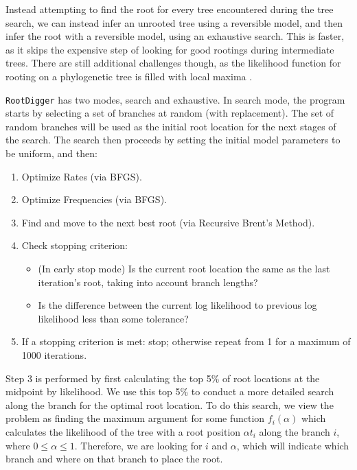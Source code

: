 \documentclass{article}
\newcommand{\RootDiggertt}{\texttt{RootDigger}}
\begin{document}
Instead attempting to find the root for every tree encountered during the tree
search, we can instead infer an unrooted tree using a reversible model, and then
infer the root with a reversible model, using an exhaustive search.
This is faster, as it skips the expensive step of looking for good rootings
during intermediate trees. There are still additional challenges though, as the
likelihood function for rooting on a phylogenetic tree is filled with local
maxima \cite{huelsenbeck_inferring_2002}.

\RootDiggertt{} has two modes, search and exhaustive. In search mode,
the program starts by selecting a set of branches at random (with
replacement).  The set of random branches will be used as the initial root
location for the next stages of the search. The search then proceeds by setting
the initial model parameters to be uniform, and then:

\begin{enumerate}
  \item Optimize Rates (via BFGS).
  \item Optimize Frequencies (via BFGS).
  \item Find and move to the next best root (via Recursive Brent's Method).
  \item Check stopping criterion:
        \begin{itemize}
          \item (In early stop mode) Is the current root location the same as
                the last iteration's root, taking into account branch lengths?
          \item Is the difference between the current log likelihood to previous
                log likelihood less than some tolerance?
        \end{itemize}
  \item If a stopping criterion is met: stop; otherwise repeat from 1 for a
        maximum of 1000 iterations.
\end{enumerate}

Step 3 is performed by first calculating the top 5\% of root locations at the
midpoint by likelihood. We use this top 5\% to conduct a more detailed search
along the branch for the optimal root location. To do this search, we view the
problem as finding the maximum argument for some function $f_i(\alpha)$ which
calculates the likelihood of the tree with a root position $\alpha t_i$ along
the branch $i$, where $0 \leq \alpha \leq 1$. Therefore, we are looking for $i$
and $\alpha$, which will indicate which branch and where on that branch to place
the root.
\end{document}
